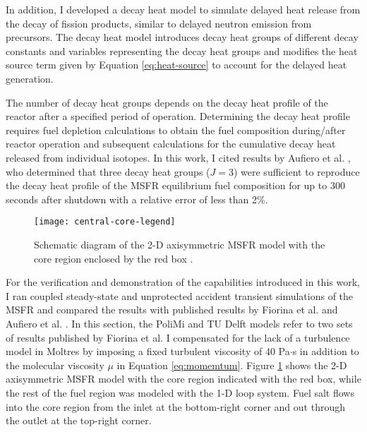 In addition, I developed a decay heat model to simulate delayed heat release
from the decay of fission products, similar to delayed neutron emission
from precursors. The decay heat model introduces decay heat groups of different
decay constants and variables representing the decay heat groups and modifies the
heat source term given by Equation \ref{eq:heat-source} to account for
the delayed heat generation. 

The number of decay heat groups depends on
the decay heat profile of the reactor after a specified period of operation.
Determining the decay heat profile requires fuel depletion calculations to
obtain the fuel composition during/after reactor operation and subsequent
calculations for the cumulative decay heat released from individual isotopes.
In this work, I cited results by Aufiero et al. \cite{aufiero_extended_2013},
who determined that three decay heat groups ($J=3$) were sufficient to
reproduce the decay heat profile of the \gls{MSFR} equilibrium fuel composition
for up to 300 seconds after shutdown with a relative error of less than 2\%.

\begin{figure}[htb!]
	\centering
	\texttt{[image: central-core-legend]}
	\caption{Schematic diagram of the 2-D axisymmetric \gls{MSFR} model with
	the core region enclosed by the red box \cite{park_advancement_2020}.}
	\label{fig:msfr-geometry}
\end{figure}

For the verification and demonstration of the capabilities introduced in this
work, I ran coupled steady-state and unprotected accident transient
simulations of the \gls{MSFR} and compared the results with published results
by Fiorina et al. \cite{fiorina_modelling_2014} and Aufiero et al.
\cite{aufiero_development_2014}. In this section, the PoliMi and TU Delft models
refer to two sets of results published by Fiorina et al. I compensated for
the lack of a turbulence model in Moltres by imposing a fixed turbulent
viscosity of 40 Pa$\cdot$s in addition to the molecular viscosity $\mu$ in
Equation \ref{eq:momemtum}. Figure \ref{fig:msfr-geometry} shows the 2-D
axisymmetric \gls{MSFR} model with the core region indicated with the red box,
while the rest of the fuel region was modeled with the 1-D loop system. Fuel
salt flows into the core region from the inlet at the bottom-right corner and
out through the outlet at the top-right corner.

